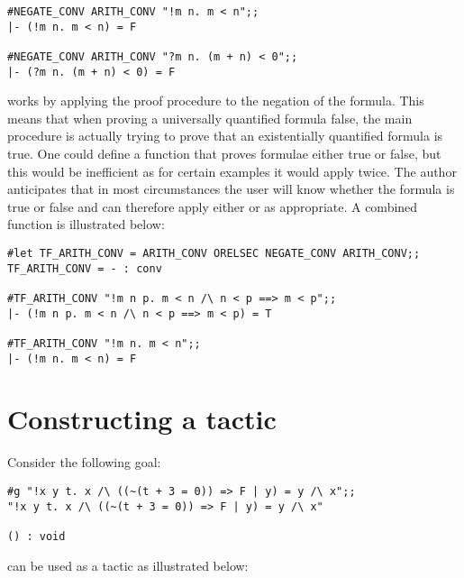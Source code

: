 \begin{session}\begin{verbatim}
#NEGATE_CONV ARITH_CONV "!m n. m < n";;
|- (!m n. m < n) = F

#NEGATE_CONV ARITH_CONV "?m n. (m + n) < 0";;
|- (?m n. (m + n) < 0) = F
\end{verbatim}\end{session}

\noindent
{} works by applying the proof procedure to the
negation of the formula. This means that when proving a
universally quantified formula false, the main procedure is actually trying to
prove that an existentially quantified formula is true. One could define a
function that proves formulae either true or false, but this would be
inefficient as for certain examples it would apply  twice. The
author anticipates that in most circumstances the user will know whether the
formula is true or false and can therefore apply either  or
 as appropriate. A combined function is
illustrated below:

\begin{session}\begin{verbatim}
#let TF_ARITH_CONV = ARITH_CONV ORELSEC NEGATE_CONV ARITH_CONV;;
TF_ARITH_CONV = - : conv

#TF_ARITH_CONV "!m n p. m < n /\ n < p ==> m < p";;
|- (!m n p. m < n /\ n < p ==> m < p) = T

#TF_ARITH_CONV "!m n. m < n";;
|- (!m n. m < n) = F
\end{verbatim}\end{session}


\section{Constructing a tactic}

Consider the following goal:

\begin{session}\begin{verbatim}
#g "!x y t. x /\ ((~(t + 3 = 0)) => F | y) = y /\ x";;
"!x y t. x /\ ((~(t + 3 = 0)) => F | y) = y /\ x"

() : void
\end{verbatim}\end{session}

\noindent
{} can be used as a tactic as illustrated below:

